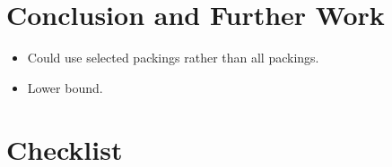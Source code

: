 \documentclass{elsarticle}
\begin{document}
\section{Conclusion and Further Work}
\label{sec:conclusion}
{\color{myPurple}
\begin{itemize}[leftmargin=*]
	\item Could use selected packings rather than all packings.
	\item Lower bound.
\end{itemize}
}

\section{Checklist}
\end{document}
